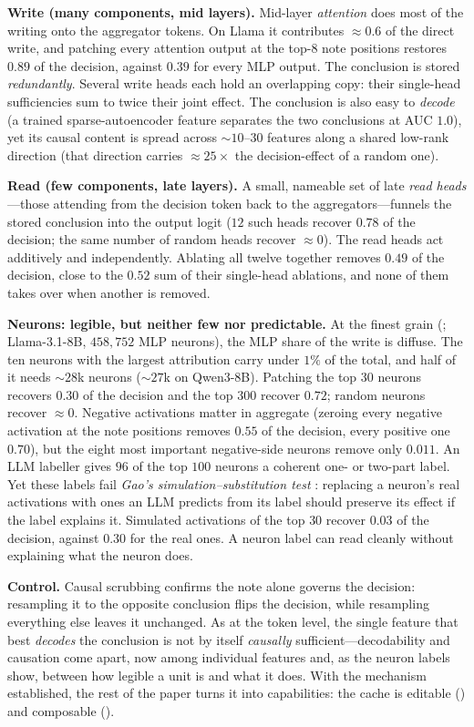 \textbf{Write (many components, mid layers).} Mid-layer \emph{attention} does most of the writing onto the
aggregator tokens. On Llama it contributes $\approx0.6$ of the direct write, and patching every attention
output at the top-$8$ note positions restores $0.89$ of the decision, against $0.39$ for every MLP output.
The conclusion is stored \emph{redundantly}. Several write heads each hold an overlapping copy: their
single-head sufficiencies sum to twice their joint effect. The conclusion is also easy to \emph{decode}
(a trained sparse-autoencoder feature separates the two conclusions at AUC $1.0$), yet its causal content
is spread across ${\sim}10$--$30$ features along a shared low-rank direction (that direction carries
$\approx25\times$ the decision-effect of a random one).

\textbf{Read (few components, late layers).} A small, nameable set of late \emph{read heads}---those
attending from the decision token back to the aggregators---funnels the stored conclusion into the output
logit ($12$ such heads recover $0.78$ of the decision; the same number of random heads recover $\approx0$).
The read heads act additively and independently. Ablating all twelve together removes $0.49$ of the
decision, close to the $0.52$ sum of their single-head ablations, and none of them takes over when
another is removed.

\textbf{Neurons: legible, but neither few nor predictable.} At the finest grain (;
Llama-3.1-8B, $458{,}752$ MLP neurons), the MLP share of the write is diffuse. The ten neurons with the
largest attribution carry under $1\%$ of the total, and half of it needs ${\sim}28$k neurons (${\sim}27$k on
Qwen3-8B). Patching the top $30$ neurons recovers $0.30$ of the decision and the top $300$ recover $0.72$;
random neurons recover $\approx0$. Negative activations matter in aggregate (zeroing every negative
activation at the note positions removes $0.55$ of the decision, every positive one $0.70$), but the eight
most important negative-side neurons remove only $0.011$. An LLM labeller gives $96$ of the top $100$
neurons a coherent one- or two-part label. Yet these labels fail \emph{Gao's simulation--substitution test} \citep{gao2026notclean}:
replacing a neuron's real activations with ones an LLM predicts from its label should preserve its effect
if the label explains it. Simulated activations of the top $30$ recover $0.03$ of the decision, against $0.30$
for the real ones. A neuron label can read cleanly without explaining what the neuron does.

\textbf{Control.} Causal scrubbing confirms the note alone governs the decision: resampling it to the
opposite conclusion flips the decision, while resampling everything else leaves it unchanged. As at the
token level, the single feature that best \emph{decodes} the conclusion is not by itself \emph{causally}
sufficient---decodability and causation come apart, now among individual features and, as the neuron
labels show, between how legible a unit is and what it does. With the mechanism
established, the rest of the paper turns it into capabilities: the cache is editable ()
and composable ().
